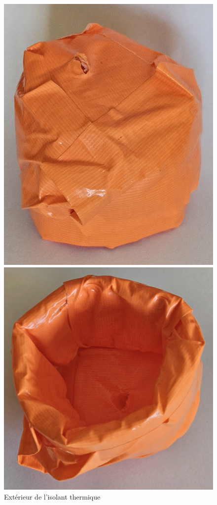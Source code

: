 \begin{figure}[H]
    \centering
    \begin{minipage}{0.48\textwidth}
        \centering
        \includegraphics[width=\textwidth]{assets/figures/Exterieur_Isolant.jpg}
        \caption{Extérieur de l'isolant thermique}
        \label{fig:Exterieur_Isolant}
    \end{minipage}\hfill
    \begin{minipage}{0.48\textwidth}
        \centering
        \includegraphics[width=\textwidth]{assets/figures/Interieur_Isolant.jpg}

\end{minipage}
\end{figure}
